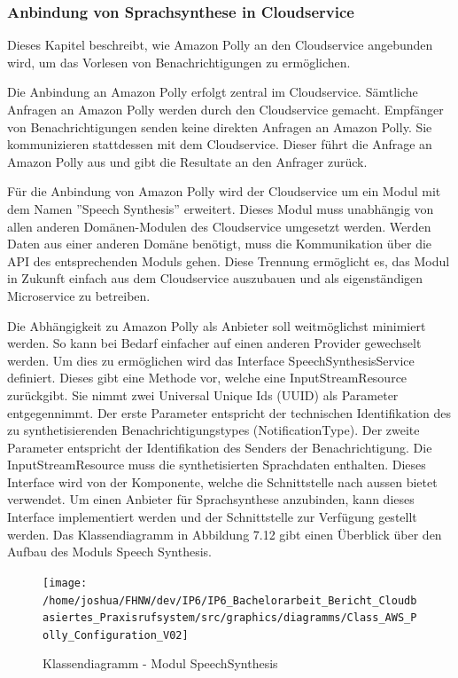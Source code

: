 \subsubsection{Anbindung von Sprachsynthese in Cloudservice}

Dieses Kapitel beschreibt, wie Amazon Polly an den Cloudservice angebunden wird, um das Vorlesen von Benachrichtigungen zu ermöglichen.

Die Anbindung an Amazon Polly erfolgt zentral im Cloudservice.
Sämtliche Anfragen an Amazon Polly werden durch den Cloudservice gemacht.
Empfänger von Benachrichtigungen senden keine direkten Anfragen an Amazon Polly.
Sie kommunizieren stattdessen mit dem Cloudservice.
Dieser führt die Anfrage an Amazon Polly aus und gibt die Resultate an den Anfrager zurück.

Für die Anbindung von Amazon Polly wird der Cloudservice um ein Modul mit dem Namen ''Speech Synthesis'' erweitert.
Dieses Modul muss unabhängig von allen anderen Domänen-Modulen des Cloudservice umgesetzt werden.
Werden Daten aus einer anderen Domäne benötigt, muss die Kommunikation über die API des entsprechenden Moduls gehen.
Diese Trennung ermöglicht es, das Modul in Zukunft einfach aus dem Cloudservice auszubauen und als eigenständigen Microservice zu betreiben.

Die Abhängigkeit zu Amazon Polly als Anbieter soll weitmöglichst minimiert werden.
So kann bei Bedarf einfacher auf einen anderen Provider gewechselt werden.
Um dies zu ermöglichen wird das Interface SpeechSynthesisService definiert.
Dieses gibt eine Methode vor, welche eine InputStreamResource zurückgibt.
Sie nimmt zwei Universal Unique Ids (UUID) als Parameter entgegennimmt.
Der erste Parameter entspricht der technischen Identifikation des zu synthetisierenden Benachrichtigungstypes (NotificationType).
Der zweite Parameter entspricht der Identifikation des Senders der Benachrichtigung.
Die InputStreamResource muss die synthetisierten Sprachdaten enthalten.
Dieses Interface wird von der Komponente, welche die Schnittstelle nach aussen bietet verwendet.
Um einen Anbieter für Sprachsynthese anzubinden, kann dieses Interface implementiert werden und der Schnittstelle zur Verfügung gestellt werden.
Das Klassendiagramm in Abbildung 7.12 gibt einen Überblick über den Aufbau des Moduls Speech Synthesis.

\begin{figure}[h]
    \centering
    \begin{minipage}[b]{1\textwidth}
        \texttt{[image: /home/joshua/FHNW/dev/IP6/IP6\_Bachelorarbeit\_Bericht\_Cloudbasiertes\_Praxisrufsystem/src/graphics/diagramms/Class\_AWS\_Polly\_Configuration\_V02]}
        \caption{Klassendiagramm - Modul SpeechSynthesis}
    \end{minipage}
\end{figure}

